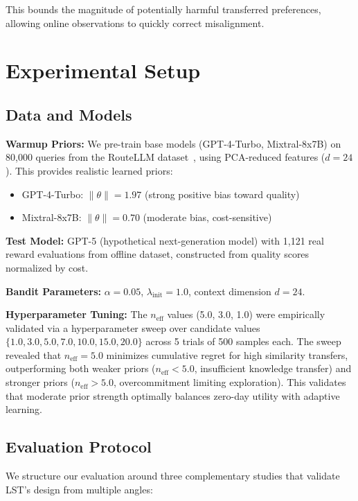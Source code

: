 \documentclass[sigconf,nonacm]{acmart}
\begin{document}
This bounds the magnitude of potentially harmful transferred preferences, allowing online observations to quickly correct misalignment.

\section{Experimental Setup}

\subsection{Data and Models}

\textbf{Warmup Priors:} We pre-train base models (GPT-4-Turbo, Mixtral-8x7B) on 80,000 queries from the RouteLLM dataset~\cite{routellm2024}, using PCA-reduced features ($d=24$). This provides realistic learned priors:
\begin{itemize}
    \item GPT-4-Turbo: $\|\theta\| = 1.97$ (strong positive bias toward quality)
    \item Mixtral-8x7B: $\|\theta\| = 0.70$ (moderate bias, cost-sensitive)
\end{itemize}

\textbf{Test Model:} GPT-5 (hypothetical next-generation model) with 1,121 real reward evaluations from offline dataset, constructed from quality scores normalized by cost.

\textbf{Bandit Parameters:} $\alpha = 0.05$, $\lambda_{\text{init}} = 1.0$, context dimension $d = 24$.

\textbf{Hyperparameter Tuning:} The $n_{\text{eff}}$ values (5.0, 3.0, 1.0) were empirically validated via a hyperparameter sweep over candidate values $\{1.0, 3.0, 5.0, 7.0, 10.0, 15.0, 20.0\}$ across 5 trials of 500 samples each. The sweep revealed that $n_{\text{eff}} = 5.0$ minimizes cumulative regret for high similarity transfers, outperforming both weaker priors ($n_{\text{eff}} < 5.0$, insufficient knowledge transfer) and stronger priors ($n_{\text{eff}} > 5.0$, overcommitment limiting exploration). This validates that moderate prior strength optimally balances zero-day utility with adaptive learning.

\subsection{Evaluation Protocol}

We structure our evaluation around three complementary studies that validate LST's design from multiple angles:
\end{document}
